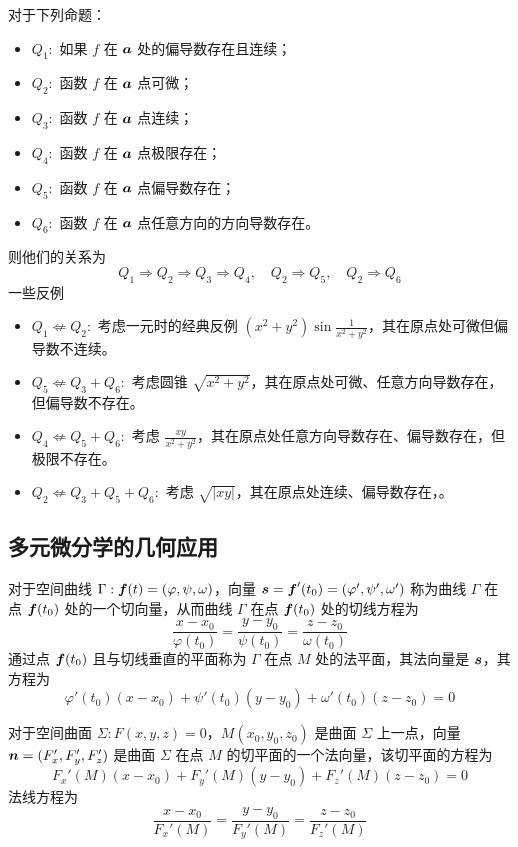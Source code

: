 对于下列命题：
\begin{itemize}
	\item $Q_1:$ 如果 $f$ 在 $\boldsymbol{a}$ 处的偏导数存在且连续；
	\item $Q_2:$ 函数 $f$ 在 $\boldsymbol{a}$ 点可微；
	\item $Q_3:$ 函数 $f$ 在 $\boldsymbol{a}$ 点连续；
	\item $Q_4:$ 函数 $f$ 在 $\boldsymbol{a}$ 点极限存在；
	\item $Q_5:$ 函数 $f$ 在 $\boldsymbol{a}$ 点偏导数存在；
	\item $Q_6:$ 函数 $f$ 在 $\boldsymbol{a}$ 点任意方向的方向导数存在。
\end{itemize}
则他们的关系为
\[ Q_1 \Rightarrow Q_2 \Rightarrow Q_3 \Rightarrow Q_4, \quad Q_2 \Rightarrow Q_5, \quad Q_2 \Rightarrow Q_6 \]
一些反例
\begin{itemize}
	\item $Q_1 \not\Leftarrow Q_2:$ 考虑一元时的经典反例 $(x^2+y^2) \sin \frac{1}{x^2+y^2}$，其在原点处可微但偏导数不连续。
	\item $Q_5 \not\Leftarrow Q_3 + Q_6:$ 考虑圆锥 $\sqrt{x^2+y^2}$，其在原点处可微、任意方向导数存在，但偏导数不存在。
	\item $Q_4 \not\Leftarrow Q_5 + Q_6:$ 考虑 $\frac{xy}{x^2+y^2}$，其在原点处任意方向导数存在、偏导数存在，但极限不存在。
	\item $Q_2 \not\Leftarrow Q_3 + Q_5 + Q_6:$ 考虑 $\sqrt{|xy|}$，其在原点处连续、偏导数存在，。
\end{itemize}

\subsection{多元微分学的几何应用}

对于空间曲线 $\Gamma: \boldsymbol{f}(t) = (\varphi, \psi, \omega)$，向量 $\boldsymbol{s} = \boldsymbol{f}'(t_0) = (\varphi', \psi', \omega')$ 称为曲线 $\Gamma$ 在点 $\boldsymbol{f}(t_0)$ 处的一个切向量，从而曲线 $\Gamma$ 在点 $\boldsymbol{f}(t_0)$ 处的切线方程为
\[ \frac{x - x_0}{\varphi(t_0)} = \frac{y - y_0}{\psi(t_0)} = \frac{z - z_0}{\omega(t_0)} \]
通过点 $\boldsymbol{f}(t_0)$ 且与切线垂直的平面称为 $\Gamma$ 在点 $M$ 处的法平面，其法向量是 $\boldsymbol{s}$，其方程为
\[ \varphi'(t_0)(x - x_0) + \psi'(t_0)(y - y_0) + \omega'(t_0)(z - z_0) = 0 \]

对于空间曲面 $\Sigma: F(x, y, z) = 0$，$M(x_0, y_0, z_0)$ 是曲面 $\Sigma$ 上一点，向量 $\boldsymbol{n} = (F_x', F_y', F_z')$ 是曲面 $\Sigma$ 在点 $M$ 的切平面的一个法向量，该切平面的方程为
\[ F_x'(M)(x-x_0) + F_y'(M) (y-y_0) + F_z'(M) (z- z_0) = 0 \]
法线方程为
\[ \frac{x - x_0}{F_x'(M)} = \frac{y - y_0}{F_y'(M)} = \frac{z - z_0}{F_z'(M)} \]

